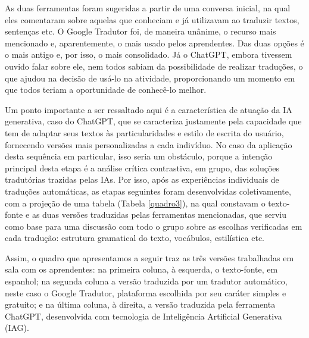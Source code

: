 \documentclass[portuguese]{textolivre}
\begin{document}
As duas ferramentas foram sugeridas a partir de uma conversa inicial, na qual eles comentaram sobre aquelas que conheciam e já utilizavam ao traduzir textos, sentenças etc. O Google Tradutor foi, de maneira unânime, o recurso mais mencionado e, aparentemente, o mais usado pelos aprendentes. Das duas opções é o mais antigo e, por isso, o mais consolidado. Já o ChatGPT, embora tivessem ouvido falar sobre ele, nem todos sabiam da possibilidade de realizar traduções, o que ajudou na decisão de usá-lo na atividade, proporcionando um momento em que todos teriam a oportunidade de conhecê-lo melhor.

Um ponto importante a ser ressaltado aqui é a característica de atuação da IA generativa, caso do ChatGPT, que se caracteriza justamente pela capacidade que tem de adaptar seus textos às particularidades e estilo de escrita do usuário, fornecendo versões mais personalizadas a cada indivíduo. No caso da aplicação desta sequência em particular, isso seria um obstáculo, porque a intenção principal desta etapa é a análise crítica contrastiva, em grupo, das soluções tradutórias trazidas pelas IAs. Por isso, após as experiências individuais de traduções automáticas, as etapas seguintes foram desenvolvidas coletivamente, com a projeção de uma tabela (Tabela \ref{quadro3}), na qual constavam o texto-fonte e as duas versões traduzidas pelas ferramentas mencionadas, que serviu como base para uma discussão com todo o grupo sobre as escolhas verificadas em cada tradução: estrutura gramatical do texto, vocábulos, estilística etc.

Assim, o quadro que apresentamos a seguir traz as três versões trabalhadas em sala com os aprendentes: na primeira coluna, à esquerda, o texto-fonte, em espanhol; na segunda coluna a versão traduzida por um tradutor automático, neste caso o Google Tradutor, plataforma escolhida por seu caráter simples e gratuito; e na última coluna, à direita, a versão traduzida pela ferramenta ChatGPT, desenvolvida com tecnologia de Inteligência Artificial Generativa (IAG).
\end{document}
